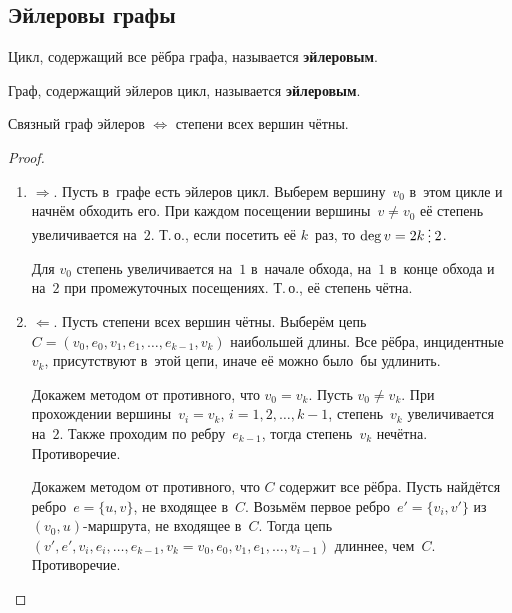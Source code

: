\subsection{Эйлеровы графы}
Цикл, содержащий все рёбра графа, называется \textbf{эйлеровым}.

 Граф, содержащий эйлеров цикл, называется \textbf{эйлеровым}.

\begin{theorem}
Связный граф эйлеров $\Leftrightarrow$ степени всех вершин чётны.
\end{theorem}
\begin{proof}
\begin{enumerate}
	\item $\Rightarrow$. Пусть в~графе есть эйлеров цикл.
	Выберем вершину~$v_0$ в~этом цикле и начнём обходить его.
	При каждом посещении вершины~$v \neq v_0$ её степень увеличивается на~$2$.
	Т.\,о., если посетить её $k$~раз, то $\deg v = 2k \mult 2$.
	
	Для $v_0$ степень увеличивается на~$1$ в~начале обхода, на~$1$ в~конце обхода и на~$2$ при промежуточных посещениях.
	Т.\,о., её степень чётна.
	
	\item $\Leftarrow$. Пусть степени всех вершин чётны.
	Выберём цепь~$C = (v_0, e_0, v_1, e_1, \ldots, e_{k-1}, v_k)$ наибольшей длины.
	Все рёбра, инцидентные~$v_k$, присутствуют в~этой цепи, иначе её можно было~бы удлинить.
	
	Докажем методом от противного, что $v_0 = v_k$.
	Пусть $v_0 \neq v_k$.
	При прохождении вершины~$v_i = v_k$, $i = 1, 2, \ldots, k - 1$, степень~$v_k$ увеличивается на~$2$.
	Также проходим по ребру~$e_{k-1}$, тогда степень~$v_k$ нечётна.
	Противоречие.
	
	Докажем методом от противного, что $C$ содержит все рёбра.	
	Пусть найдётся ребро~$e = \{ u, v \}$, не входящее в~$C$.
	Возьмём первое ребро~$e' = \{ v_i, v' \}$ из $(v_0, u)$-маршрута, не входящее в~$C$.
	Тогда цепь~$(v', e', v_i, e_i, \ldots, e_{k-1}, v_k = v_0, e_0, v_1, e_1, \ldots, v_{i-1})$ длиннее, чем~$C$.
	Противоречие.
\end{enumerate}
\end{proof}

